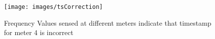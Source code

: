 \begin{figure} 
	\centering
	\texttt{[image: images/tsCorrection]}
	\caption[Frequency Values sensed at different meters indicate that timestamp for meter 4 is incorrect]{Frequency Values sensed at different meters indicate that timestamp for meter 4 is incorrect}
	\label{fig:tsCorrection}
\end{figure}
